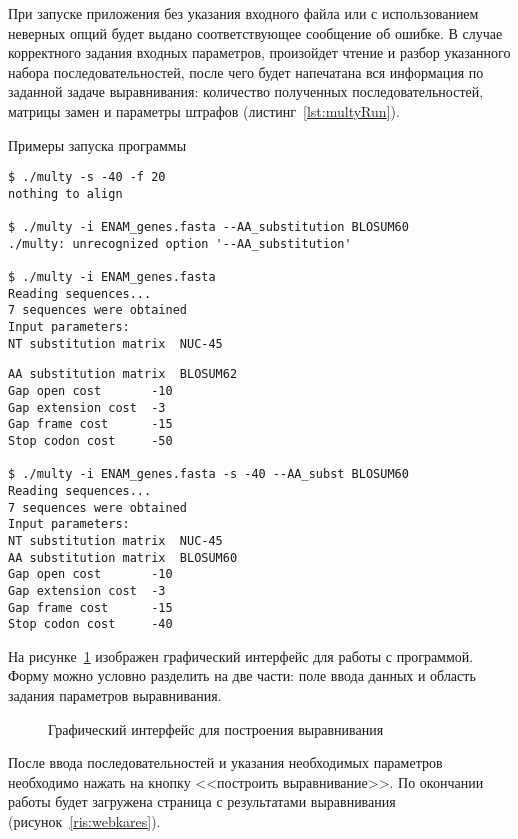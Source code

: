 При запуске приложения без указания входного файла или с использованием неверных опций будет выдано соответствующее сообщение об ошибке. В случае корректного задания входных параметров, произойдет чтение и разбор указанного набора последовательностей, после чего будет напечатана вся информация по заданной задаче выравнивания: количество полученных последовательностей, матрицы замен и параметры штрафов (листинг~\ref{lst:multyRun}).

\begin{algorithm}[H]
	\caption{Примеры запуска программы} \label{lst:multyRun}
	\begin{lstlisting}
$ ./multy -s -40 -f 20
nothing to align

$ ./multy -i ENAM_genes.fasta --AA_substitution BLOSUM60
./multy: unrecognized option '--AA_substitution'

$ ./multy -i ENAM_genes.fasta 
Reading sequences...
7 sequences were obtained
Input parameters:
NT substitution matrix	NUC-45
	\end{lstlisting}
\end{algorithm}

\begin{algorithm}
	\begin{lstlisting}
AA substitution matrix	BLOSUM62
Gap open cost		-10
Gap extension cost	-3
Gap frame cost		-15
Stop codon cost		-50

$ ./multy -i ENAM_genes.fasta -s -40 --AA_subst BLOSUM60
Reading sequences...
7 sequences were obtained
Input parameters:
NT substitution matrix	NUC-45
AA substitution matrix	BLOSUM60
Gap open cost		-10
Gap extension cost	-3
Gap frame cost		-15
Stop codon cost		-40
	\end{lstlisting}
\end{algorithm}

На рисунке~\ref{ris:webka} изображен графический интерфейс для работы с программой. Форму можно условно разделить на две части: поле ввода данных и область задания параметров выравнивания. 

\begin{figure}[H]
	\caption{Графический интерфейс для построения выравнивания}
	\label{ris:webka}
\end{figure}

После ввода последовательностей и указания необходимых параметров необходимо нажать на кнопку <<построить выравнивание>>. По окончании работы будет загружена страница с результатами выравнивания (рисунок~\ref{ris:webkares}).

